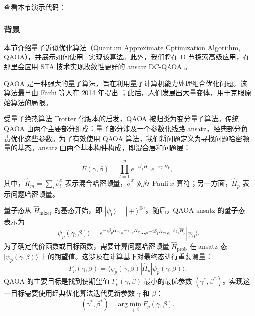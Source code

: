 


查看本节演示代码： \ 

\subsubsection{背景}

本节介绍量子近似优化算法（Quantum Approximate Optimization Algorithm, QAOA），并展示如何使用 \MindQuantum\ 实现该算法。此外，我们将在 D 节探索高级应用，在那里会应用 STA 技术实现收敛性更好的 ansatz DC-QAOA \cite{PhysRevResearch.4.013141}。


QAOA 是一种强大的量子算法，旨在利用量子计算机能力处理组合优化问题。该算法最早由 Farhi 等人在 2014 年提出 \cite{farhi2014quantum}；此后，人们发展出大量变体，用于克服原始算法的局限。

受量子绝热算法 Trotter 化版本的启发，QAOA 被归类为变分量子算法。传统 QAOA 由两个主要部分组成：量子部分涉及一个参数化线路 ansatz，经典部分负责优化这些参数。为了有效使用 QAOA 算法，我们将问题定义为寻找问题哈密顿量的基态。ansatz 由两个基本构件构成，即混合层和问题层：

\begin{equation}
    U(\gamma, \beta) = \prod_{l=1}^p e^{-i\beta_l \hat{H}_{m}}e^{-i\gamma_l\hat{H}{{p}}},
\end{equation}
其中，$\hat{H}_{{m}} = \sum_i \hat{\sigma}^x_i$ 表示混合哈密顿量，$\hat{\sigma}^x$ 对应 Pauli $x$ 算符；另一方面，$\hat{H}_{{p}}$ 表示问题哈密顿量。

量子态从 $\hat{H}_{\text{mixer}}$ 的基态开始，即 $|\psi_0\rangle=|+\rangle^{\otimes n}$。随后，QAOA ansatz 的量子态表示为：
\begin{equation}
    |\psi_p(\gamma, \beta)\rangle = e^{-i\beta_p\hat{H}_m}e^{-i\gamma_p\hat{H}_p}\cdots e^{-i\beta_1\hat{H}_{m}}e^{-i\gamma_1\hat{H}_{p}}|\psi_0\rangle.
\end{equation}
为了确定代价函数或目标函数，需要计算问题哈密顿量 $\hat{H}_{\text{prob}}$ 在 ansatz 态 $|\psi_p(\gamma, \beta)\rangle$ 上的期望值。这涉及在计算基下对最终态进行重复测量：
\begin{equation}
    F_p(\gamma, \beta) =\langle\psi_p(\gamma, \beta)|\hat{H}_{p} |\psi_p(\gamma,\beta)\rangle.
\end{equation}
QAOA 的主要目标是找到使期望值 $F_p(\gamma, \beta)$ 最小的最优参数 $(\gamma^*, \beta^*)$。实现这一目标需要使用经典优化算法迭代更新参数 $\gamma$ 和 $\beta$：
\begin{equation}
    (\gamma^*, \beta^*) = \text{arg}\min_{\gamma, \beta} F_p(\gamma, \beta).
\end{equation}

